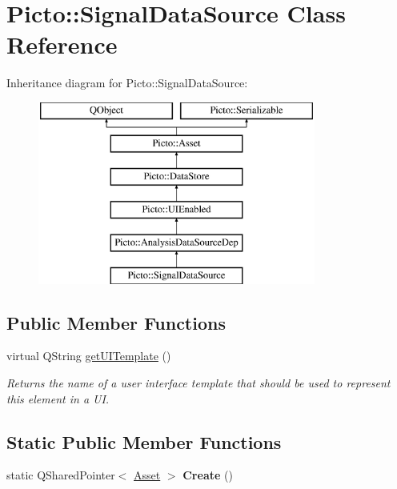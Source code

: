 \hypertarget{class_picto_1_1_signal_data_source}{\section{Picto\-:\-:Signal\-Data\-Source Class Reference}
\label{class_picto_1_1_signal_data_source}
}
Inheritance diagram for Picto\-:\-:Signal\-Data\-Source\-:\begin{figure}[H]
\begin{center}
\leavevmode
\includegraphics[height=6.000000cm]{class_picto_1_1_signal_data_source}
\end{center}
\end{figure}
\subsection*{Public Member Functions}
\begin{DoxyCompactItemize}
\item 
\hypertarget{class_picto_1_1_signal_data_source_af3978e51cba54a61145cdb007dfb4eab}{virtual Q\-String \hyperlink{class_picto_1_1_signal_data_source_af3978e51cba54a61145cdb007dfb4eab}{get\-U\-I\-Template} ()}\label{class_picto_1_1_signal_data_source_af3978e51cba54a61145cdb007dfb4eab}

\begin{DoxyCompactList}\small\item\em Returns the name of a user interface template that should be used to represent this element in a U\-I. \end{DoxyCompactList}\end{DoxyCompactItemize}
\subsection*{Static Public Member Functions}
\begin{DoxyCompactItemize}
\item 
\hypertarget{class_picto_1_1_signal_data_source_aa376ee57d6312c456db3990a484fe813}{static Q\-Shared\-Pointer$<$ \hyperlink{class_picto_1_1_asset}{Asset} $>$ {\bfseries Create} ()}\label{class_picto_1_1_signal_data_source_aa376ee57d6312c456db3990a484fe813}

\end{DoxyCompactItemize}
